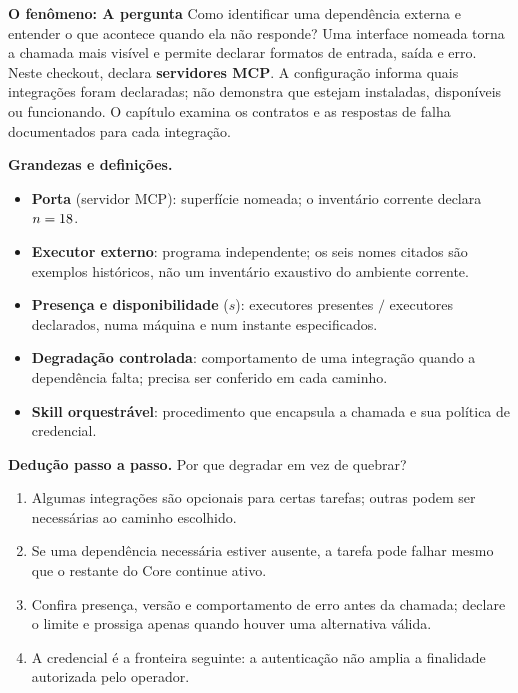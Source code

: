 \begin{descricao}
\textbf{O fenômeno: A pergunta}  Como identificar uma dependência externa e entender o que
acontece quando ela não responde? Uma interface nomeada torna a chamada mais
visível e permite declarar formatos de entrada, saída e erro. Neste checkout,
 declara \textbf{\CoreMCPCount{} servidores MCP}. A configuração informa
quais integrações foram declaradas; não demonstra que estejam instaladas,
disponíveis ou funcionando. O capítulo examina os contratos e as respostas de
falha documentados para cada integração.
\end{descricao}

\begin{definicao}
\textbf{Grandezas e definições.}
\begin{itemize}[leftmargin=1.3em,itemsep=1pt]
  \item \textbf{Porta} (servidor MCP): superfície nomeada; o inventário corrente declara $n = 18$.
  \item \textbf{Executor externo}: programa independente; os seis nomes citados são exemplos históricos, não um inventário exaustivo do ambiente corrente.
  \item \textbf{Presença e disponibilidade} ($s$): executores presentes $/$ executores declarados, numa máquina e num instante especificados.
  \item \textbf{Degradação controlada}: comportamento de uma integração quando a dependência falta; precisa ser conferido em cada caminho.
  \item \textbf{Skill orquestrável}: procedimento que encapsula a chamada e sua política de credencial.
\end{itemize}
\end{definicao}

\begin{metodo}
\textbf{Dedução passo a passo.} Por que degradar em vez de quebrar?
\begin{enumerate}[leftmargin=1.4em,itemsep=2pt]
  \item Algumas integrações são opcionais para certas tarefas; outras podem ser necessárias ao caminho escolhido.
  \item Se uma dependência necessária estiver ausente, a tarefa pode falhar mesmo que o restante do Core continue ativo.
  \item Confira presença, versão e comportamento de erro antes da chamada; declare o limite e prossiga apenas quando houver uma alternativa válida.
  \item A credencial é a fronteira seguinte: a autenticação não amplia a finalidade autorizada pelo operador.
\end{enumerate}
\end{metodo}


